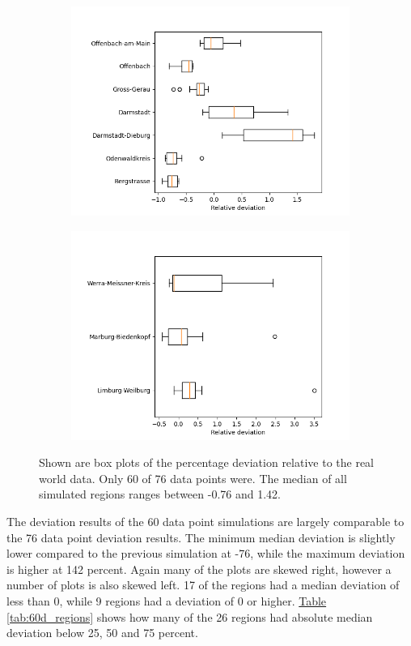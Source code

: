 \begin{figure}[h]
\begin{subfigure}[b]{0.4\textwidth}
		\includegraphics[width=\textwidth]{./figures/60d/deviation_box60_3.png}	
	\end{subfigure}
	\begin{subfigure}[b]{0.4\textwidth}
		\centering
		\includegraphics[width=\textwidth]{./figures/60d/deviation_box60_4.png}	
	\end{subfigure}
	\caption{Shown are box plots of the percentage deviation relative to the real world data. 
		Only 60 of 76 data points were. The median of all simulated regions ranges between -0.76 and 1.42.
		}
	\label{fig:60_sim_box}
\end{figure}

The deviation results of the 60 data point simulations are largely comparable to the 76 data point deviation results.
The minimum median deviation is slightly lower compared to the previous simulation at -76, while the maximum deviation is higher at 142 percent. 
Again many of the plots are skewed right, however a number of plots is also skewed left. 17 of the regions had a median deviation of less than
0, while 9 regions had a deviation of 0 or higher. \hyperref[tab:60d_regions]{Table \ref*{tab:60d_regions}} shows how many of the 26 regions had
absolute median deviation below 25, 50 and 75 percent.

